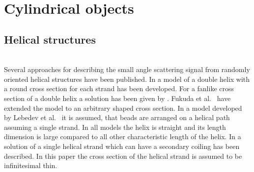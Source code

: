 \clearpage
\section{Cylindrical objects}



\subsection{Helical structures} ~\\
Several approaches for describing the small angle scattering signal from randomly oriented helical structures have been published.
In \cite{Franklin1956,Puigjaner1974} a model of a double helix with a round cross section for each strand has been developed. For a fanlike cross section of a double helix a solution has been given by \cite{Schmidt1970,Pringle1971}. Fukuda et al.\ \cite{Fukuda2002} have extended the model to an arbitrary shaped cross section. In a model developed by Lebedev et al.\ \cite{Lebedev2003} it is assumed, that beads are arranged on a helical path assuming a single strand. In all models the helix is straight and its length dimension is large compared to all other characteristic length of the helix.
In \cite{Benham1980} a solution of a single helical strand which can have a secondary coiling has been described. In this paper the cross section of the helical strand is assumed to be infinitesimal thin.

~\\
